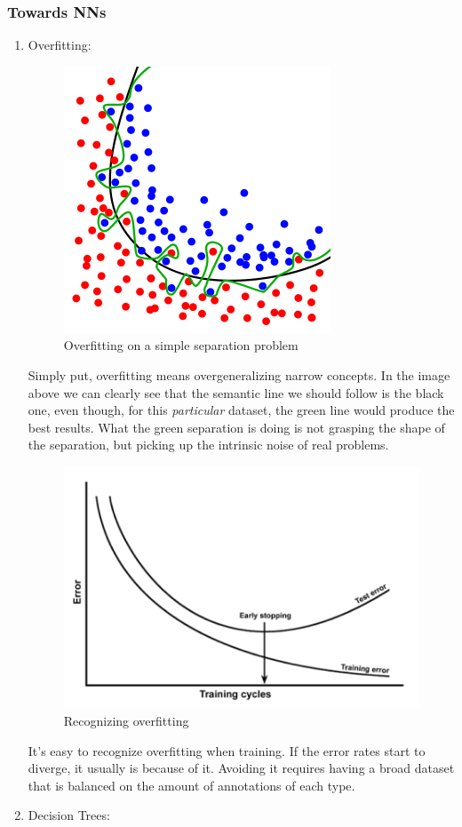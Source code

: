 \subsubsection{Towards NNs}\label{s:fund-intro-tonn}
\begin{enumerate}
	\item Overfitting:
		\begin{figure}[H]
			\centering
			\includegraphics[scale=0.4]{images/overfitting.png}
			\caption{Overfitting on a simple separation problem}
			\label{f:overfitting}
		\end{figure}
		Simply put, overfitting means overgeneralizing narrow concepts. In the image above we can clearly see that the semantic line we should follow is the black one, even though, for this \emph{particular} dataset, the green line would produce the best results.
		What the green separation is doing is not grasping the shape of the separation, but picking up the intrinsic noise of real problems.
		
		\begin{figure}[H]
			\centering
			\includegraphics[scale=1.2]{images/overfittinglines.png}
			\caption{Recognizing overfitting}
			\label{f:overfittinglines}
		\end{figure}
		It's easy to recognize overfitting when training. If the error rates start to diverge, it usually is because of it. Avoiding it requires having a broad dataset that is balanced on the amount of annotations of each type.
	\item Decision Trees:
		

\end{enumerate}
